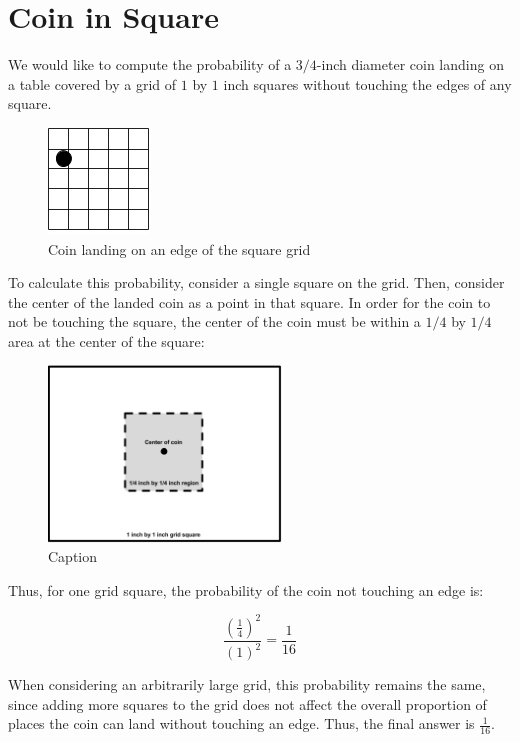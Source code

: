 \documentclass{article}
\date{}
\author{Kaan Aksoy | Feb 13, 2020}
\begin{document}
\maketitle

\section{Coin in Square}

We would like to compute the probability of a $3/4$-inch 
diameter coin landing on a table covered by a grid of $1$ 
by $1$ inch squares without touching the edges of any square.

\begin{figure}[h]
\centering
\includegraphics{CoinOnGrid}
\caption{Coin landing on an edge of the square grid}
\end{figure}

To calculate this probability, consider a single square 
on the grid. Then, consider the center of the landed coin 
as a point in that square. In order for the coin to not be 
touching the square, the center of the coin must be 
within a $1/4$ by $1/4$ area at the center of the square:

\begin{figure}[h]
    \centering
    \includegraphics[width=6.25cm]{CoinValidSpots}
    \caption{Caption}
\end{figure}

Thus, for one grid square, the probability of the 
coin not touching an edge is:

$$ \frac{\left( \frac{1}{4} \right)^2}{(1)^2} = \frac{1}{16}$$

When considering an arbitrarily large grid, this probability 
remains the same, since adding more squares to the 
grid does not affect the overall proportion of places the coin 
can land without touching an edge. Thus, the final answer is $\frac{1}{16}$.
\end{document}
